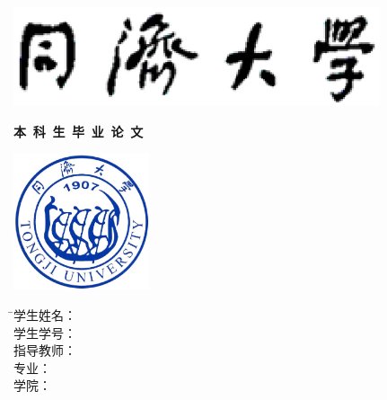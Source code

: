 \thispagestyle{empty}

\vspace{10mm}

\begin{center}
	\includegraphics[width=108mm]{pic/logo}
\end{center}

\centerline{\songti \erhao \textbf{本\, 科\, 生\, 毕\, 业\, 论\, 文}}
\vspace{8mm}

\begin{center}
	\includegraphics[width=40mm]{pic/tj}
\end{center}

\vspace{32mm}

\begin{tabbing}
	\hspace{30mm} \= \songti\sihao 学生姓名： \=\underline{\makebox[6cm]{\sihao\tjuauthornamec} }\\[2mm]
	\>\songti \sihao 学生学号：\> \underline{\makebox[6cm]{\sihao \tjuauthorid}} \\[2mm]
	\>\songti \sihao 指导教师：\> \underline{\makebox[6cm]{\sihao \tjumentorc}}\\[2mm]
	\> \songti\sihao 专\hspace{10mm}业： \> \underline{\makebox[6cm]{\sihao\tjugrade\hspace{3mm}\tjumajor}} \\[2mm]
	\>\songti \sihao 学\hspace{10mm}院：\> \underline{\makebox[6cm]{\sihao \tjucollegec}}
\end{tabbing}





